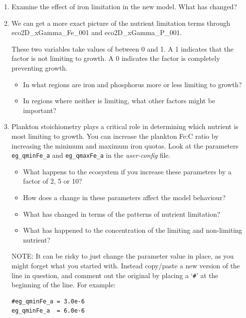 \documentclass[11pt,fleqn]{book} %
\begin{document}
\vspace{2mm}
\begin{enumerate}[noitemsep]

\item Examine the effect of iron limitation in the new model. What has changed?

\item We can get a more exact picture of the nutrient limitation terms through \textsf{\small eco2D\_xGamma\_Fe\_001} and \textsf{\small eco2D\_xGamma\_P\_001}.

These two variables take values of between 0 and 1. A \textsf{\small 1} indicates that the factor is not limiting to growth. A \textsf{\small 0} indicates the factor is completely preventing growth. 
\vspace{1mm}
\begin{itemize}
\item In what regions are iron and phosphorus more or less limiting to growth? \item In regions where neither is limiting, what other factors might be important?
\end{itemize}
\vspace{1mm}

\item  Plankton stoichiometry plays a critical role in determining which nutrient is most limiting to growth. You can increase the plankton Fe:C ratio by increasing the minimum and maximum iron quotas. Look at the parameters \texttt{eg\_qminFe\_a} and \texttt{eg\_qmaxFe\_a} in the \textit{user-config} file.
\vspace{1mm}
\begin{itemize}
\item What happens to the ecosystem if you increase these parameters by a factor of 2, 5 or 10?
\item How does a change in these parameters affect the model behaviour?
\item What has changed in terms of the patterns of nutrient limitation?
\item What has happened to the concentration of the limiting and non-limiting nutrient?
\end{itemize}
\vspace{1mm}

\item[NOTE:] It can be risky to just change the parameter value in place, as you might forget what you started with. Instead copy/paste a new version of the line in question, and comment out the original by placing a `\texttt{\#}' at the beginning of the line. For example:
\small\begin{verbatim}
#eg_qminFe_a = 3.0e-6
eg_qminFe_a  = 6.0e-6
\end{verbatim}\normalsize


\end{enumerate}
\end{document}
